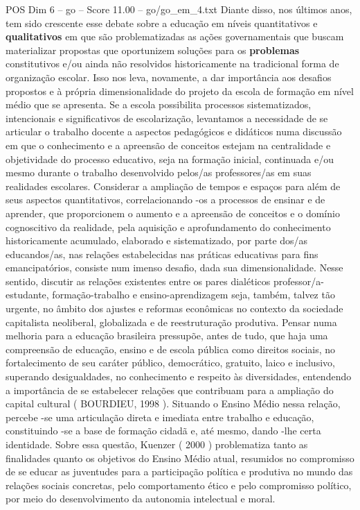 \begin{textsample}{POS Dim 6 – go – Score 11.00 – go/go\_em\_4.txt}
Diante disso, nos últimos anos, tem sido crescente esse debate sobre a educação em níveis quantitativos e \textbf{qualitativos} em que são problematizadas as ações governamentais que buscam materializar propostas que oportunizem soluções para os \textbf{problemas} constitutivos e/ou ainda não resolvidos historicamente na tradicional forma de organização escolar.
Isso nos leva, novamente, a dar importância aos desafios propostos e à própria dimensionalidade do projeto da escola de formação em nível médio que se apresenta.
Se a escola possibilita processos sistematizados, intencionais e significativos de escolarização, levantamos a necessidade de se articular o trabalho docente a aspectos pedagógicos e didáticos numa discussão em que o conhecimento e a apreensão de conceitos estejam na centralidade e objetividade do processo educativo, seja na formação inicial, continuada e/ou mesmo durante o trabalho desenvolvido pelos/as professores/as em suas realidades escolares.
Considerar a ampliação de tempos e espaços para além de seus aspectos quantitativos, correlacionando -os a processos de ensinar e de aprender, que proporcionem o aumento e a apreensão de conceitos e o domínio cognoscitivo da realidade, pela aquisição e aprofundamento do conhecimento historicamente acumulado, elaborado e sistematizado, por parte dos/as educandos/as, nas relações estabelecidas nas práticas educativas para fins emancipatórios, consiste num imenso desafio, dada sua dimensionalidade.
Nesse sentido, discutir as relações existentes entre os pares dialéticos professor/a-estudante, formação-trabalho e ensino-aprendizagem seja, também, talvez tão urgente, no âmbito dos ajustes e reformas econômicas no contexto da sociedade capitalista neoliberal, globalizada e de reestruturação produtiva.
Pensar numa melhoria para a educação brasileira pressupõe, antes de tudo, que haja uma compreensão de educação, ensino e de escola pública como direitos sociais, no fortalecimento de seu caráter público, democrático, gratuito, laico e inclusivo, superando desigualdades, no conhecimento e respeito às diversidades, entendendo a importância de se estabelecer relações que contribuam para a ampliação do capital cultural ( BOURDIEU, 1998 ).
Situando o Ensino Médio nessa relação, percebe -se uma articulação direta e imediata entre trabalho e educação, constituindo -se a base de formação cidadã e, até mesmo, dando -lhe certa identidade.
Sobre essa questão, Kuenzer ( 2000 ) problematiza tanto as finalidades quanto os objetivos do Ensino Médio atual, resumidos no compromisso de se educar as juventudes para a participação política e produtiva no mundo das relações sociais concretas, pelo comportamento ético e pelo compromisso político, por meio do desenvolvimento da autonomia intelectual e moral.

\end{textsample}
